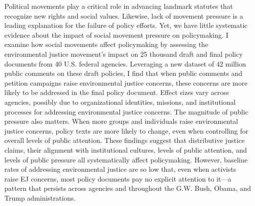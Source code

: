 Political movements play a critical role in advancing landmark statutes that recognize new rights and social values. Likewise, lack of movement pressure is a leading explanation for the failure of policy efforts. Yet, we have little systematic evidence about the impact of social movement pressure on policymaking. I examine how social movements affect policymaking by assessing the environmental justice movement's impact on 25 thousand draft and final policy documents from 40 U.S. federal agencies. Leveraging a new dataset of 42 million public comments on these draft policies, I find that when public comments and petition campaigns raise environmental justice concerns, these concerns are more likely to be addressed in the final policy document. Effect sizes vary across agencies, possibly due to organizational identities, missions, and institutional processes for addressing environmental justice concerns. The magnitude of public pressure also matters. When more groups and individuals raise environmental justice concerns, policy texts are more likely to change, even when controlling for overall levels of public attention. These findings suggest that distributive justice claims, their alignment with institutional cultures, levels of public attention, and levels of public pressure all systematically affect policymaking. However, baseline rates of addressing environmental justice are so low that, even when activists raise EJ concerns, most policy documents pay no explicit attention to it---a pattern that persists across agencies and throughout the G.W. Bush, Obama, and Trump administrations.